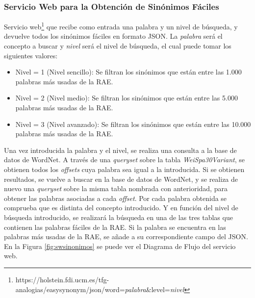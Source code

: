 \subsubsection{Servicio Web para la Obtención de Sinónimos Fáciles}
\label{cap:subsec:sw_sinonimosfaciles}
Servicio web\footnote{https://holstein.fdi.ucm.es/tfg-analogias/easysynonym/json/word=\textit{palabra}\&level=\textit{nivel}} que recibe como entrada una palabra y un nivel de búsqueda, y devuelve todos los sinónimos fáciles en formato JSON. La \textit{palabra} será el concepto a buscar y \textit{nivel} será el nivel de búsqueda, el cual puede tomar los siguientes valores:
\begin{itemize}
	\item Nivel = 1 (Nivel sencillo): Se filtran los sinónimos que están entre las 1.000 palabras más usadas de la RAE.
	\item Nivel = 2 (Nivel medio): Se filtran los sinónimos que están entre las 5.000 palabras más usadas de la RAE.
	\item Nivel = 3 (Nivel avanzado): Se filtran los sinónimos que están entre las 10.000 palabras más usadas de la RAE.
\end{itemize}


Una vez introducida la palabra y el nivel, se realiza una consulta a la base de datos de WordNet. A través de una \textit{queryset} sobre la tabla \textit{WeiSpa30Variant}, se obtienen todos los \textit{offsets} cuya palabra sea igual a la introducida.
Si se obtienen resultados, se vuelve a buscar en la base de datos de WordNet, y se realiza de nuevo una \textit{queryset} sobre la misma tabla nombrada con anterioridad, para obtener las palabras asociadas a cada \textit{offset}. Por cada palabra obtenida  se comprueba que es distinta del concepto introducido. Y en función del nivel de búsqueda introducido, se realizará la búsqueda en una de las tres tablas que contienen las palabras fáciles de la RAE. Si la palabra se encuentra en las palabras más usadas de la RAE, se añade a su correspondiente campo del JSON. En la Figura \ref{fig:swsinonimos} se puede ver el Diagrama de Flujo del servicio web.

